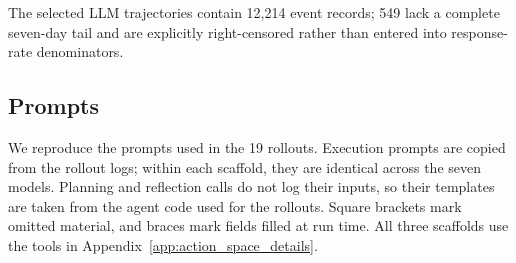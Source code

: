 The selected LLM trajectories contain 12,214 event records; 549 lack a complete seven-day tail and are explicitly right-censored rather than entered into response-rate denominators.

\FloatBarrier
\raggedbottom
\subsection{Prompts}
\label{appendix:prompts}

We reproduce the prompts used in the 19 rollouts. Execution prompts are copied from the rollout logs; within each scaffold, they are identical across the seven models. Planning and reflection calls do not log their inputs, so their templates are taken from the agent code used for the rollouts. Square brackets mark omitted material, and braces mark fields filled at run time. All three scaffolds use the tools in Appendix~\ref{app:action_space_details}.

